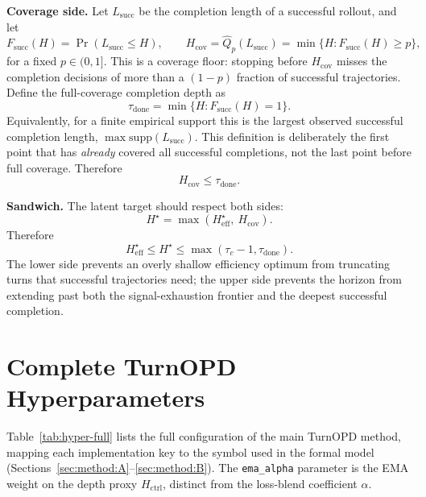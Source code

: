 \textbf{Coverage side.}
Let $L_{\mathrm{succ}}$ be the completion length of a successful rollout, and
let
\begin{equation}
F_{\mathrm{succ}}(H)=\Pr(L_{\mathrm{succ}}\le H),\qquad
H_{\mathrm{cov}}=\widehat Q_p(L_{\mathrm{succ}})
  =\min\{H:F_{\mathrm{succ}}(H)\ge p\},
\label{eq:app-hcov}
\end{equation}
for a fixed $p\in(0,1]$. This is a coverage floor: stopping before
$H_{\mathrm{cov}}$ misses the completion decisions of more than a $(1-p)$
fraction of successful trajectories. Define the full-coverage completion depth
as
\begin{equation}
\tau_{\mathrm{done}}
  =
  \min\{H:F_{\mathrm{succ}}(H)=1\}.
\label{eq:app-tau-done}
\end{equation}
Equivalently, for a finite empirical support this is the largest observed
successful completion length, $\max\mathrm{supp}(L_{\mathrm{succ}})$. This
definition is deliberately the first point that has \emph{already} covered all
successful completions, not the last point before full coverage. Therefore
\begin{equation}
H_{\mathrm{cov}}\le \tau_{\mathrm{done}} .
\label{eq:app-hcov-upper}
\end{equation}

\textbf{Sandwich.}
The latent target should respect both sides:
\begin{equation}
H^\star
  =
  \max\!\left(H_{\mathrm{eff}}^\star,\ H_{\mathrm{cov}}\right).
\label{eq:app-hstar-sandwich-def}
\end{equation}
Therefore
\begin{equation}
H_{\mathrm{eff}}^\star
\le
H^\star
\le
\max\!\left(\tau_c-1,\tau_{\mathrm{done}}\right).
\label{eq:app-hstar-sandwich}
\end{equation}
The lower side prevents an overly shallow efficiency optimum from truncating
turns that successful trajectories need; the upper side prevents the horizon
from extending past both the signal-exhaustion frontier and the deepest
successful completion.


\section{Complete TurnOPD Hyperparameters}
\label{app:hyper}

Table~\ref{tab:hyper-full} lists the full configuration of the main TurnOPD method,
mapping each implementation key to the symbol used in the formal model
(Sections~\ref{sec:method:A}--\ref{sec:method:B}).
The \texttt{ema\_alpha} parameter is the EMA weight on the depth proxy
$H_{\mathrm{ctrl}}$, distinct from the loss-blend coefficient $\alpha$.

